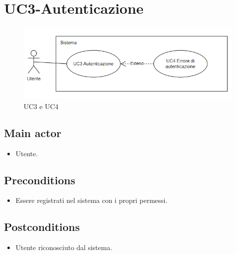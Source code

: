 \documentclass{article}
\begin{document}
\section{UC3-Autenticazione}
    \begin{figure}[h]
      \centering
      \includegraphics{documenti/imgUML/UC3-AUTENTICAZIONE.png}
      \caption{UC3 e UC4}
      \label{fig:UC3 AUTENTICAZIONE}
    \end{figure} 
    
     \subsection*{Main actor}
         \begin{itemize}
             \item Utente.
         \end{itemize}
     \subsection*{Preconditions} 
        \begin{itemize}
            \item Essere registrati nel sistema con i propri permessi.
        \end{itemize}
               
    \subsection*{Postconditions}
        \begin{itemize}
            \item Utente riconosciuto dal sistema.
        \end{itemize}
\end{document}
